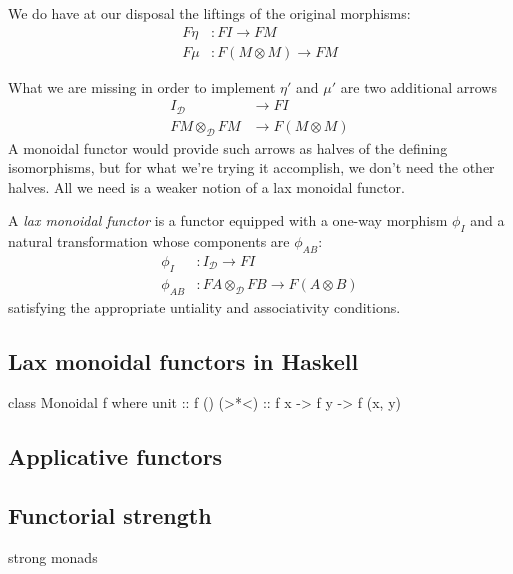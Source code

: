 \documentclass[DaoFP]{subfiles}
\begin{document}
We do have at our disposal the liftings of the original morphisms:
\begin{align*}
 F \eta &\colon F I \to F M \\
 F \mu &\colon F (M \otimes M) \to F M
\end{align*}

What we are missing in order to implement $\eta'$ and $\mu'$ are two additional arrows 
\begin{align*}
I_{\mathcal{D}} &\to F I\\
 F M \otimes_{\mathcal{D}} F M &\to F (M \otimes M)
 \end{align*}
A monoidal functor would provide such arrows as halves of the defining isomorphisms, but for what we're trying it accomplish, we don't need the other halves. All we need is a weaker notion of a lax monoidal functor. 

A \emph{lax monoidal functor} is a functor equipped with a one-way morphism $\phi_I$ and a natural transformation whose components are $\phi_{A B}$:
\begin{align*}
\phi_I &\colon I_{\mathcal{D}} \to F I \\
\phi_{A B} &\colon F A \otimes_{\mathcal{D}} F B \to F (A \otimes B)
\end{align*}
satisfying the appropriate untiality and associativity conditions.

\subsection{Lax monoidal functors in Haskell}

\begin{haskell}
class Monoidal f where
  unit  :: f ()
  (>*<) :: f x -> f y -> f (x, y)
\end{haskell}

\subsection{Applicative functors}

\subsection{Functorial strength}

strong monads
\end{document}

